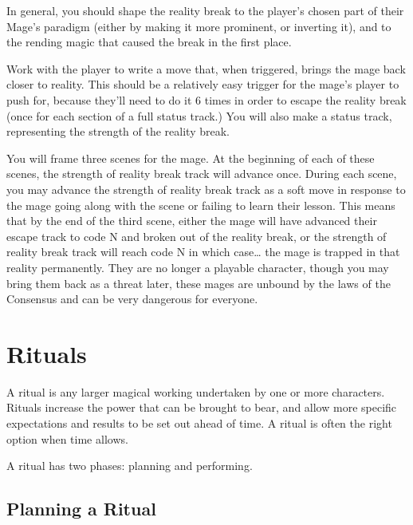 \documentclass[
  oneside,
  statementpaper,
  9pt]{memoir}
\begin{document}
\begin{MC}

In general, you should shape the reality break to the player's chosen part of their Mage's paradigm (either by making it more prominent, or inverting it), and to the rending magic that caused the break in the first place.

Work with the player to write a move that, when triggered, brings the mage back closer to reality. This should be a relatively easy trigger for the mage’s player to push for, because they’ll need to do it 6 times in order to escape the reality break (once for each section of a full status track.) You will also make a status track, representing the strength of the reality break.

You will frame three scenes for the mage. At the beginning of each of these scenes, the strength of reality break track will advance once. During each scene, you may advance the strength of reality break track as a soft move in response to the mage going along with the scene or failing to learn their lesson. This means that by the end of the third scene, either the mage will have advanced their escape track to code N and broken out of the reality break, or the strength of reality break track will reach code N in which case… the mage is trapped in that reality permanently. They are no longer a playable character, though you may bring them back as a threat later, these mages are unbound by the laws of the Consensus and can be very dangerous for everyone.

\end{MC}

\hypertarget{rituals}{%
\section{Rituals}\label{rituals}}

\begin{Player}

A ritual is any larger magical working undertaken by one or more characters. Rituals increase the power that can be brought to bear, and allow more specific expectations and results to be set out ahead of time. A ritual is often the right option when time allows.

A ritual has two phases: planning and performing.

\end{Player}

\hypertarget{planning-a-ritual}{%
\subsection{Planning a Ritual}\label{planning-a-ritual}}
\end{document}
